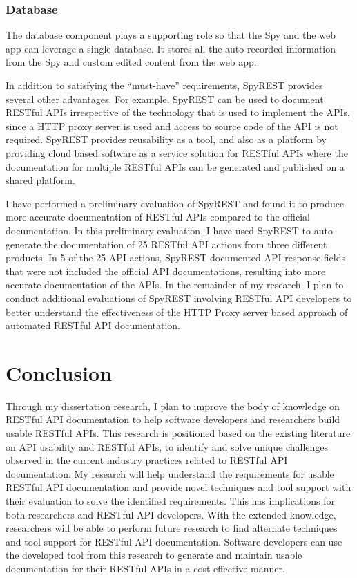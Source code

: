 \documentclass[11pt,oneside]{book}
\begin{document}
\subsubsection{Database}

The database component plays a supporting role so that the Spy and the web app can leverage a single database. It stores all the auto-recorded information from the Spy and custom edited content from the web app.

In addition to satisfying the “must-have” requirements, SpyREST provides several other advantages. For example, SpyREST can be used to document RESTful APIs irrespective of the technology that is used to implement the APIs, since a HTTP proxy server is used and access to source code of the API is not required. SpyREST provides reusability as a tool, and also as a platform by providing cloud based software as a service solution for RESTful APIs where the documentation for multiple RESTful APIs can be generated and published on a shared platform.

I have performed a preliminary evaluation of SpyREST and found it to produce more accurate documentation of RESTful APIs compared to the official documentation. In this preliminary evaluation, I have used SpyREST to auto-generate the documentation of 25 RESTful API actions from three different products. In 5 of the 25 API actions, SpyREST documented API response fields that were not included the official API documentations, resulting into more accurate documentation of the APIs. In the remainder of my research, I plan to conduct additional evaluations of SpyREST involving RESTful API developers to better understand the effectiveness of the HTTP Proxy server based approach of automated RESTful API documentation.

\section{Conclusion}

Through my dissertation research, I plan to improve the body of knowledge on RESTful API documentation to help software developers and researchers build usable RESTful APIs. This research is positioned based on the existing literature on API usability and RESTful APIs, to identify and solve unique challenges observed in the current industry practices related to RESTful API documentation. My research will help understand the requirements for usable RESTful API documentation and provide novel techniques and tool support with their evaluation to solve the identified requirements. This has implications for both researchers and RESTful API developers. With the extended knowledge, researchers will be able to perform future research to find alternate techniques and tool support for RESTful API documentation. Software developers can use the developed tool from this research to generate and maintain usable documentation for their RESTful APIs in a cost-effective manner.
\end{document}
